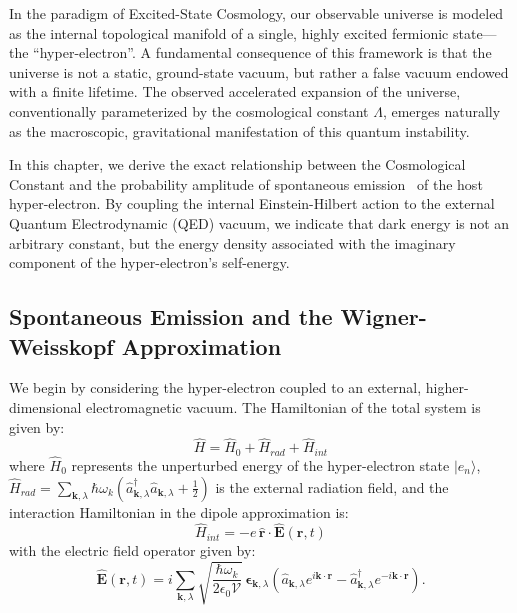 In the paradigm of Excited-State Cosmology, our observable universe is modeled as the internal topological manifold of a single, highly excited fermionic state---the ``hyper-electron''. A fundamental consequence of this framework is that the universe is not a static, ground-state vacuum, but rather a false vacuum endowed with a finite lifetime. The observed accelerated expansion of the universe, conventionally parameterized by the cosmological constant $\Lambda$, emerges naturally as the macroscopic, gravitational manifestation of this quantum instability. 

In this chapter, we derive the exact relationship between the Cosmological Constant and the probability amplitude of spontaneous emission~\cite{Weisskopf1930} of the host hyper-electron. By coupling the internal Einstein-Hilbert action to the external Quantum Electrodynamic (QED) vacuum, we indicate that dark energy is not an arbitrary constant, but the energy density associated with the imaginary component of the hyper-electron's self-energy.

\subsection{Spontaneous Emission and the Wigner-Weisskopf Approximation}

We begin by considering the hyper-electron coupled to an external, higher-dimensional electromagnetic vacuum. The Hamiltonian of the total system is given by:
\begin{equation}
    \hat{H} = \hat{H}_0 + \hat{H}_{rad} + \hat{H}_{int}
\end{equation}
where $\hat{H}_0$ represents the unperturbed energy of the hyper-electron state $|e_n\rangle$, $\hat{H}_{rad} = \sum_{\mathbf{k},\lambda} \hbar \omega_k \left( \hat{a}_{\mathbf{k},\lambda}^\dagger \hat{a}_{\mathbf{k},\lambda} + \frac{1}{2} \right)$ is the external radiation field, and the interaction Hamiltonian in the dipole approximation is:
\begin{equation}
    \hat{H}_{int} = -e \, \hat{\mathbf{r}} \cdot \hat{\mathbf{E}}(\mathbf{r}, t)
\end{equation}
with the electric field operator given by:
\begin{equation}
    \hat{\mathbf{E}}(\mathbf{r}, t) = i \sum_{\mathbf{k},\lambda} \sqrt{\frac{\hbar \omega_k}{2 \epsilon_0 \mathcal{V}}} \, \mathbf{\epsilon}_{\mathbf{k},\lambda} \left( \hat{a}_{\mathbf{k},\lambda} e^{i\mathbf{k}\cdot\mathbf{r}} - \hat{a}_{\mathbf{k},\lambda}^\dagger e^{-i\mathbf{k}\cdot\mathbf{r}} \right).
\end{equation}

